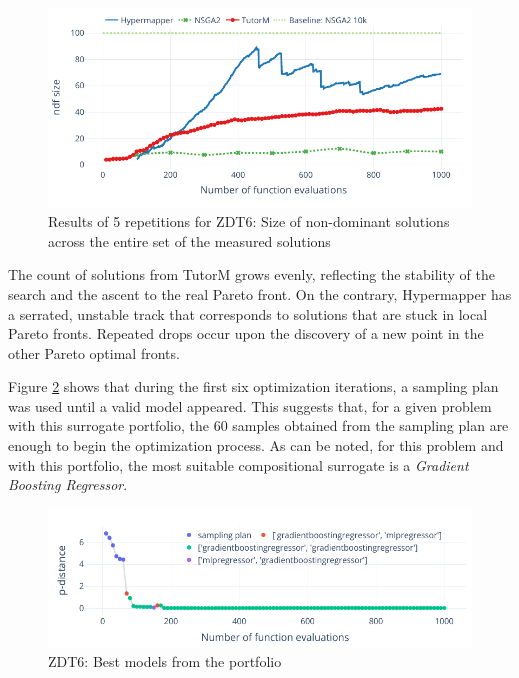         \begin{figure}[h]
            \centering
            \includegraphics[width=\textwidth]{content/images/zdt6_ndf}
            \caption[Results of 5 repetitions for ZDT6: Size of non-dominant solutions across the entire set of the measured solutions]{Results of 5 repetitions for ZDT6: Size of non-dominant solutions across the entire set of the measured solutions}
            \label{fig:zdt6_ndf}
        \end{figure}
    
    The count of solutions from TutorM grows evenly, reflecting the stability of the search and the ascent to the real Pareto front. On the contrary, Hypermapper has a serrated, unstable track that corresponds to solutions that are stuck in local Pareto fronts. Repeated drops occur upon the discovery of a new point in the other Pareto optimal fronts. 
   
    Figure \ref{fig:zdt6_models} shows that during the first six optimization iterations, a sampling plan was used until a valid model appeared. This suggests that, for a given problem with this surrogate portfolio, the 60 samples obtained from the sampling plan are enough to begin the optimization process. As can be noted, for this problem and with this portfolio, the most suitable compositional surrogate is a \emph{Gradient Boosting Regressor}.  

    \begin{figure}[!h]
        \centering
        \includegraphics[width=\textwidth]{content/images/zdt6_models}
        \caption[ZDT6: Best models from the portfolio]{ZDT6: Best models from the portfolio}
        \label{fig:zdt6_models}
    \end{figure} 
    
